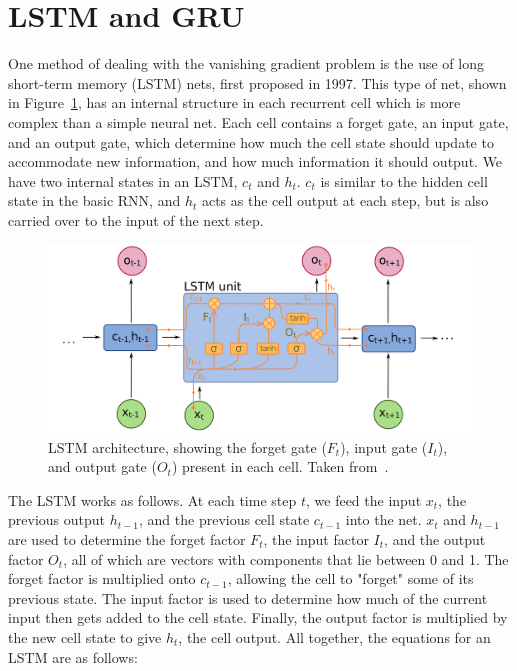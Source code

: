 \section{LSTM and GRU}

One method of dealing with the vanishing gradient problem is the use of long short-term memory (LSTM) nets, first proposed in 1997. This type of net, shown in Figure~\ref{fig:LSTM_diagram}, has an internal structure in each recurrent cell which is more complex than a simple neural net. Each cell contains a forget gate, an input gate, and an output gate, which determine how much the cell state should update to accommodate new information, and how much information it should output. We have two internal states in an LSTM, $c_t$ and $h_t$. $c_t$ is similar to the hidden cell state in the basic RNN, and $h_t$ acts as the cell output at each step, but is also carried over to the input of the next step.

\begin{figure}[htbp]
    \centering
    \includegraphics[width=\linewidth]{Images/ML/LSTM.png}
    \caption{LSTM architecture, showing the forget gate ($F_t$), input gate ($I_t$), and output gate ($O_t$) present in each cell. Taken from~\cite{LSTMDiagram}.}
    \label{fig:LSTM_diagram}
\end{figure}

The LSTM works as follows. At each time step $t$, we feed the input $x_t$, the previous output $h_{t-1}$, and the previous cell state $c_{t-1}$ into the net. $x_t$ and $h_{t-1}$ are used to determine the forget factor $F_t$, the input factor $I_t$, and the output factor $O_t$, all of which are vectors with components that lie between 0 and 1. The forget factor is multiplied onto $c_{t-1}$, allowing the cell to "forget" some of its previous state. The input factor is used to determine how much of the current input then gets added to the cell state. Finally, the output factor is multiplied by the new cell state to give $h_t$, the cell output. All together, the equations for an LSTM are as follows:

